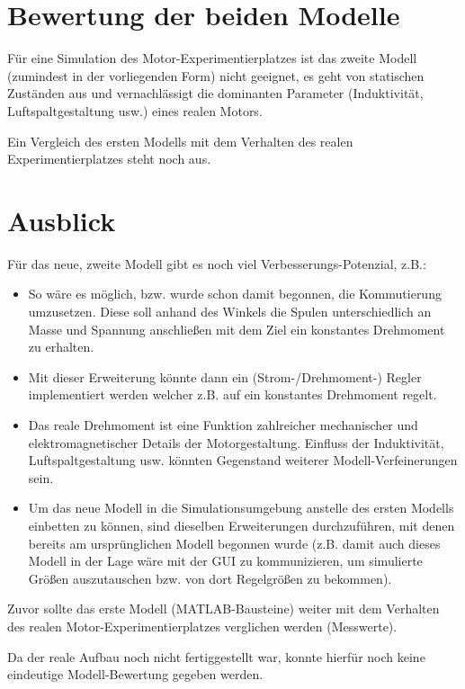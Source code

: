 \section{Bewertung der beiden Modelle}
Für eine Simulation des Motor-Experimentierplatzes ist das zweite Modell (zumindest in der vorliegenden Form) nicht geeignet, es geht von statischen Zuständen aus und vernachlässigt die dominanten Parameter (Induktivität, Luftspaltgestaltung usw.) eines realen Motors.

Ein Vergleich des ersten Modells mit dem Verhalten des realen Experimentierplatzes steht noch aus.

\section{Ausblick}
Für das neue, zweite Modell gibt es noch viel Verbesserungs-Potenzial, z.B.:

\begin{itemize}
	\item So wäre es möglich, bzw. wurde schon damit begonnen, die Kommutierung umzusetzen. Diese soll anhand des Winkels die Spulen unterschiedlich an Masse und Spannung anschließen mit dem Ziel ein konstantes Drehmoment zu erhalten.
	
	\item Mit dieser Erweiterung könnte dann ein (Strom-/Drehmoment-) Regler implementiert werden welcher z.B. auf ein konstantes Drehmoment regelt.
	
	\item Das reale Drehmoment ist eine Funktion zahlreicher mechanischer und elektromagnetischer Details der Motorgestaltung. Einfluss der Induktivität, Luftspaltgestaltung usw. könnten Gegenstand weiterer Modell-Verfeinerungen sein. 
	
	\item Um das neue Modell in die Simulationsumgebung anstelle des ersten Modells einbetten zu können, sind dieselben Erweiterungen durchzuführen, mit denen bereits am ursprünglichen Modell begonnen wurde (z.B. damit auch dieses Modell in der Lage wäre mit der GUI zu kommunizieren, um simulierte Größen auszutauschen bzw. von dort Regelgrößen zu bekommen).
\end{itemize}

Zuvor sollte das erste Modell (MATLAB-Bausteine) weiter mit dem Verhalten des realen Motor-Experimentierplatzes verglichen werden (Messwerte). 

Da der reale Aufbau noch nicht fertiggestellt war, konnte hierfür noch keine eindeutige Modell-Bewertung gegeben werden.
